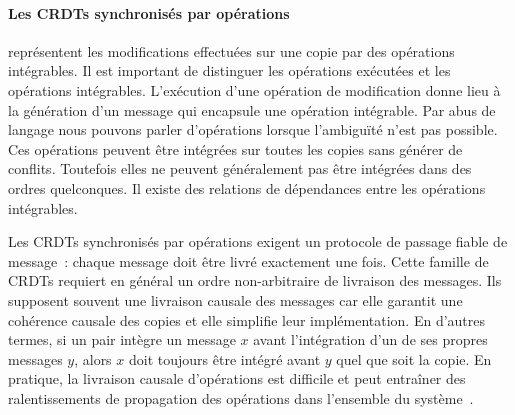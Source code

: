 \paragraph{Les \acp{CRDT} synchronisés par opérations~\autocite{baquero_2014_pure-op-crdt,baquero_2018_pure-op-crdt}} représentent les modifications effectuées sur une copie par des opérations intégrables.
Il est important de distinguer les opérations exécutées et les opérations intégrables.
L'exécution d'une opération de modification donne lieu à la génération d'un message qui encapsule une opération intégrable.
Par abus de langage nous pouvons parler d'opérations lorsque l'ambiguïté n'est pas possible.
Ces opérations peuvent être intégrées sur toutes les copies sans générer de conflits.
Toutefois elles ne peuvent généralement pas être intégrées dans des ordres quelconques.
Il existe des relations de dépendances entre les opérations intégrables.

Les \acp{CRDT} synchronisés par opérations exigent un protocole de passage fiable de message~: chaque message doit être livré exactement une fois.
Cette famille de \acp{CRDT} requiert en général un ordre non-arbitraire de livraison des messages.
Ils supposent souvent une livraison causale des messages car elle garantit une cohérence causale des copies et elle simplifie leur implémentation.
En d'autres termes, si un pair intègre un message $x$ avant l'intégration d'un de ses propres messages $y$, alors $x$ doit toujours être intégré avant $y$ quel que soit la copie.
En pratique, la livraison causale d'opérations est difficile et peut entraîner des ralentissements de propagation des opérations dans l'ensemble du système~\autocite{alvisi_2017_writes-dirty-secret}.


